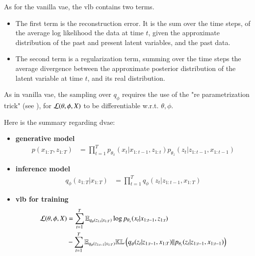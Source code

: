 As for the vanilla \gls{vae}, the \gls{vlb} contains two terms.

\begin{itemize}
    \item The first term is the reconstruction error. It is the sum over the time steps, of the average log likelihood the data at time $t$, given the approximate distribution of the past and present latent variables, and the past data.
    \item The second term is a regularization term, summing over the time steps the average divergence between the approximate posterior distribution of the latent variable at time $t$, and its real distribution.
\end{itemize}

As in vanilla \gls{vae}, the sampling over $q_\phi$ requires the use of the "re parametrization trick" (see \cite{kingma_introduction_2019}), for $\mathcal{L}(\theta, \phi, X)$ to be differentiable w.r.t. $\theta, \phi$.

Here is the summary regarding \gls{dvae}:

\begin{tcolorbox}[colback=blue!5!white,colframe=black!75!black,title=General Dynamical VAEs]
\begin{itemize}
    \item \textbf{generative model}
    \begin{align}
        \label{gen_model_dvae}
        p(x_{1:T}, z_{1:T}) &= \prod_{t=1}^T p_{\theta_x} (x_t \vert x_{1:t-1}, z_{1:t}) p_{\theta_z}(z_t \vert z_{1:t-1}, x_{1:t-1})
    \end{align}
    \item \textbf{inference model}
    \begin{align}
        \label{inf_model_dvae}
        q_{\phi}(z_{1:T} \vert x_{1:T}) &= \prod_{t=1}^T q_\phi(z_t \vert z_{1:t-1}, x_{1:T})
    \end{align}
    \item \textbf{\gls{vlb} for training}
    \begin{align}
        \label{vlb_dvae}
        \begin{split}
         \mathcal{L}(\theta, \phi, X) &= \sum_{t=1}^T \mathbb{E}_{q_\phi(z_{1:t} \vert x_{1:T})} \log{p_{\theta_x}(x_t \vert x_{1:t-1}, z_{1:t})} \\ &- \sum_{t=1}^T \mathbb{E}_{q_\phi(z_{1:t-1} \vert x_{1:T})} \mathbb{KL}\left( q_\phi(z_t \vert z_{1:t-1}, x_{1:T}) \vert\vert p_{\theta_z}(z_t \vert z_{1:t-1}, x_{1:t-1}) \right)
         \end{split}
    \end{align}
\end{itemize}
\end{tcolorbox}